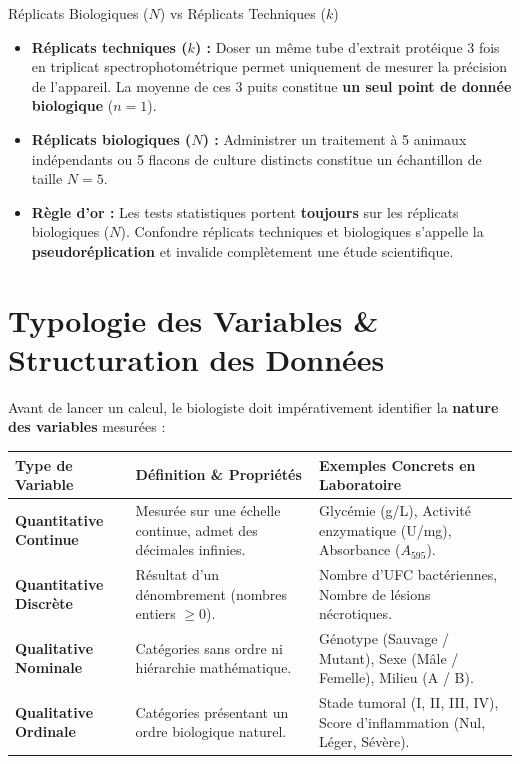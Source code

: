 \documentclass[11pt,a4paper]{article}
\begin{document}
\begin{warnbox}{Réplicats Biologiques ($N$) vs Réplicats Techniques ($k$)}
\begin{itemize}
  \item \textbf{Réplicats techniques ($k$) :} Doser un même tube d'extrait protéique 3 fois en triplicat spectrophotométrique permet uniquement de mesurer la précision de l'appareil. La moyenne de ces 3 puits constitue \textbf{un seul point de donnée biologique} ($n=1$).
  \item \textbf{Réplicats biologiques ($N$) :} Administrer un traitement à 5 animaux indépendants ou 5 flacons de culture distincts constitue un échantillon de taille $N=5$.
  \item \textbf{Règle d'or :} Les tests statistiques portent \textbf{toujours} sur les réplicats biologiques ($N$). Confondre réplicats techniques et biologiques s'appelle la \textbf{pseudoréplication} et invalide complètement une étude scientifique.
\end{itemize}
\end{warnbox}

\section{Typologie des Variables \& Structuration des Données}

Avant de lancer un calcul, le biologiste doit impérativement identifier la \textbf{nature des variables} mesurées :

\begin{center}
\small
\begin{tabularx}{\linewidth}{lXp{4.5cm}}
\toprule
\textbf{Type de Variable} & \textbf{Définition \& Propriétés} & \textbf{Exemples Concrets en Laboratoire} \\
\midrule
\textbf{Quantitative Continue} & Mesurée sur une échelle continue, admet des décimales infinies. & Glycémie (g/L), Activité enzymatique (U/mg), Absorbance ($A_{595}$). \\
\textbf{Quantitative Discrète} & Résultat d'un dénombrement (nombres entiers $\ge 0$). & Nombre d'UFC bactériennes, Nombre de lésions nécrotiques. \\
\textbf{Qualitative Nominale} & Catégories sans ordre ni hiérarchie mathématique. & Génotype (Sauvage / Mutant), Sexe (Mâle / Femelle), Milieu (A / B). \\
\textbf{Qualitative Ordinale} & Catégories présentant un ordre biologique naturel. & Stade tumoral (I, II, III, IV), Score d'inflammation (Nul, Léger, Sévère). \\
\bottomrule
\end{tabularx}
\end{center}
\end{document}
